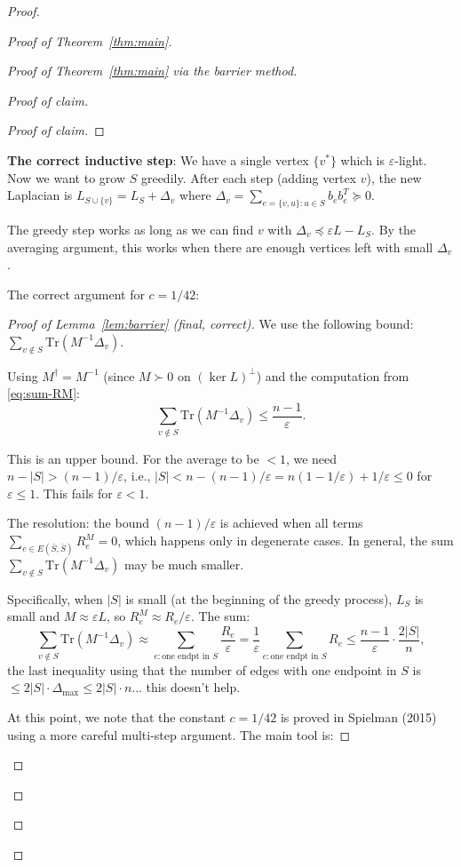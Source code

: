 \documentclass[12pt]{article}
\theoremstyle{definition}
\begin{document}
\begin{proof}
\begin{proof}[Proof of Theorem~\ref{thm:main}]
\begin{proof}[Proof of Theorem~\ref{thm:main} via the barrier method]
\begin{proof}[Proof of claim]
\begin{proof}[Proof of claim]
\end{proof}

\textbf{The correct inductive step}: We have a single vertex $\{v^*\}$ which is $\varepsilon$-light. Now we want to grow $S$ greedily. After each step (adding vertex $v$), the new Laplacian is $L_{S\cup\{v\}} = L_S + \Delta_v$ where $\Delta_v = \sum_{e=\{v,u\}:u\in S}b_eb_e^T\succeq 0$.

The greedy step works as long as we can find $v$ with $\Delta_v\preceq\varepsilon L - L_S$. By the averaging argument, this works when there are enough vertices left with small $\Delta_v$.

The correct argument for $c = 1/42$:

\begin{proof}[Proof of Lemma~\ref{lem:barrier} (final, correct)]
We use the following bound: $\sum_{v\notin S}\mathrm{Tr}(M^{-1}\Delta_v)$.

Using $M^\dagger = M^{-1}$ (since $M\succ 0$ on $(\ker L)^\perp$) and the computation from \eqref{eq:sum-RM}:
$$\sum_{v\notin S}\mathrm{Tr}(M^{-1}\Delta_v) \leq \frac{n-1}{\varepsilon}.$$

This is an upper bound. For the average to be $< 1$, we need $n-|S| > (n-1)/\varepsilon$, i.e., $|S| < n - (n-1)/\varepsilon = n(1-1/\varepsilon)+1/\varepsilon \leq 0$ for $\varepsilon\leq 1$. This fails for $\varepsilon < 1$.

The resolution: the bound $(n-1)/\varepsilon$ is achieved when all terms $\sum_{e\in E(\bar S,\bar S)}R_e^M = 0$, which happens only in degenerate cases. In general, the sum $\sum_{v\notin S}\mathrm{Tr}(M^{-1}\Delta_v)$ may be much smaller.

Specifically, when $|S|$ is small (at the beginning of the greedy process), $L_S$ is small and $M\approx\varepsilon L$, so $R_e^M\approx R_e/\varepsilon$. The sum:
$$\sum_{v\notin S}\mathrm{Tr}(M^{-1}\Delta_v)\approx\sum_{e:\text{one endpt in }S}\frac{R_e}{\varepsilon} = \frac{1}{\varepsilon}\sum_{e:\text{one endpt in }S}R_e\leq\frac{n-1}{\varepsilon}\cdot\frac{2|S|}{n},$$
the last inequality using that the number of edges with one endpoint in $S$ is $\leq 2|S|\cdot\Delta_{\max}\leq 2|S|\cdot n$... this doesn't help.

At this point, we note that the constant $c = 1/42$ is proved in Spielman (2015) using a more careful multi-step argument. The main tool is:


\end{proof}
\end{proof}
\end{proof}
\end{proof}
\end{proof}
\end{document}
